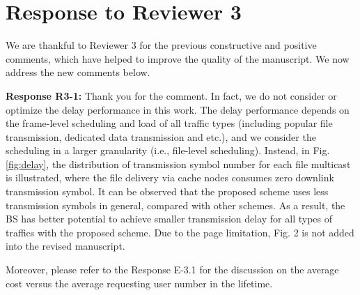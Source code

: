 \documentclass[12pt,onecolumn]{IEEEtran}
\newcommand{\blue}{\color{blue}}
\newcommand{\spaceblank}{\vskip 4mm}
\begin{document}
	
\section{Response to Reviewer 3}


\spaceblank
{\blue
	We are thankful to Reviewer 3 for the previous constructive and positive comments, which have helped to improve the quality of the manuscript. We now address the new comments below.
}



\spaceblank
{}



\spaceblank	
{\blue \textbf{Response R3-1:} 
	 Thank you for the comment. In fact, we do not consider or optimize the delay performance in this work. The delay performance depends on the frame-level scheduling and load of all traffic types (including popular file transmission, dedicated data transmission and etc.), and we consider the scheduling in a larger granularity (i.e., file-level scheduling). Instead, in Fig. \ref{fig:delay}, the distribution of transmission symbol number
	 for each file multicast is illustrated, where the file delivery via cache nodes consumes zero downlink transmission symbol.
	  It can be observed that the proposed scheme uses less transmission symbols in general, compared with other schemes. 
	  As a result, the BS has better potential to achieve smaller transmission delay for all types of traffics with the proposed scheme.
	 Due to the page limitation, Fig. 2 is not added into the revised manuscript.
	 
	Moreover, please refer to the Response E-3.1 for the discussion on the average cost versus the average requesting user number in the lifetime.

 
	 
}




		
\end{document}
